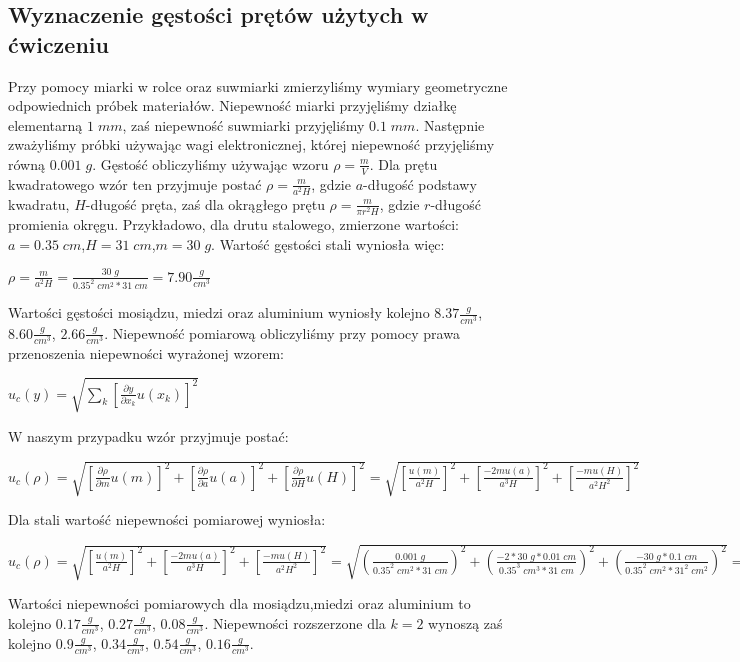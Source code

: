 \documentclass[12pt]{article}
\begin{document}
\subsection{Wyznaczenie gęstości prętów użytych w ćwiczeniu}
Przy pomocy miarki w rolce oraz suwmiarki zmierzyliśmy wymiary geometryczne odpowiednich próbek materiałów. Niepewność miarki przyjęliśmy działkę elementarną $1\;mm$, zaś niepewność suwmiarki przyjęliśmy $0.1\;mm$. Następnie zważyliśmy próbki używając wagi elektronicznej, której niepewność przyjęliśmy równą $0.001\;g$. Gęstość obliczyliśmy używając wzoru $\rho=\frac{m}{V}$. Dla prętu kwadratowego wzór ten przyjmuje postać $\rho=\frac{m}{a^2H}$, gdzie $a$-długość podstawy kwadratu, $H$-długość pręta, zaś dla okrągłego prętu $\rho=\frac{m}{\pi{r^2}H}$, gdzie $r$-długość promienia okręgu. Przykładowo, dla drutu stalowego, zmierzone wartości: $a=0.35\;cm$,$H=31\;cm$,$m=30\;g$. Wartość gęstości stali wyniosła więc:
\begin{center}
\Large $\rho=\frac{m}{a^2H}=\frac{30\;g}{0.35^2\;cm^2*31\;cm}=7.90\frac{g}{cm^3}$
\end{center}
Wartości gęstości mosiądzu, miedzi oraz aluminium wyniosły kolejno $8.37\frac{g}{cm^3}$, $8.60\frac{g}{cm^3}$, $2.66\frac{g}{cm^3}$. Niepewność pomiarową obliczyliśmy przy pomocy prawa przenoszenia niepewności wyrażonej wzorem:
\begin{center}
\Large $u_c(y)=\sqrt{\sum\limits_{k} [\frac{\partial{y}}{\partial{x_k}}u(x_k)]^2}$
\end{center}
W naszym przypadku wzór przyjmuje postać:
\begin{center}
\Large $u_c(\rho)=\sqrt{[\frac{\partial{\rho}}{\partial{m}}u(m)]^2
+[\frac{\partial{\rho}}{\partial{a}}u(a)]^2+[\frac{\partial{\rho}}{\partial{H}}u(H)]^2}=\sqrt{[\frac{u(m)}{a^2H}]^2
+[\frac{-2mu(a)}{a^3H}]^2+[\frac{-mu(H)}{a^2H^2}]^2}$
\end{center}
Dla stali wartość niepewności pomiarowej wyniosła:
\begin{center}
\Large $u_c(\rho)=\sqrt{[\frac{u(m)}{a^2H}]^2+[\frac{-2mu(a)}{a^3H}]^2+[\frac{-mu(H)}{a^2H^2}]^2}
	=\sqrt{(\frac{0.001\;g}{0.35^2\;cm^2*31\;cm})^2+(\frac{-2*30\;g*0.01\;cm}{0.35^3\;cm^3*31\;cm})^2
	+(\frac{-30\;g*0.1\;cm}{0.35^2\;cm^2*31^2\;cm^2})^2}=0.45\frac{g}{cm^3}$
\end{center}
Wartości niepewności pomiarowych dla mosiądzu,miedzi oraz aluminium to kolejno $0.17\frac{g}{cm^3}$, $0.27\frac{g}{cm^3}$, $0.08\frac{g}{cm^3}$.
Niepewności rozszerzone dla $k=2$ wynoszą zaś kolejno $0.9\frac{g}{cm^3}$, $0.34\frac{g}{cm^3}$, $0.54\frac{g}{cm^3}$, $0.16\frac{g}{cm^3}$.
\end{document}
